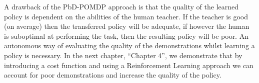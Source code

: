 A drawback of the PbD-POMDP approach is that the quality of the learned policy is dependent on the abilities 
of the human teacher. If the teacher is good (on average) then the transferred policy will be adequate, if however
the human is suboptimal at performing the task, then the resulting policy will be poor. An autonomous way of
evaluating the quality of the demonstrations whilst learning a policy is necessary. In the next chapter, ``Chapter 4'', we 
demonstrate that by introducing a cost function and using a Reinforcement Learning approach we can account
for poor demonstrations and increase the quality of the policy.
















